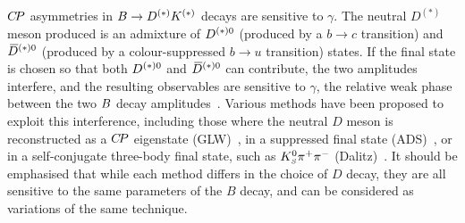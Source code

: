 \label{sec:cp_uta:notations:cus}

$C\!P$ asymmetries in $B \to D^{(*)} K^{(*)}$ decays are sensitive to $\gamma$.
The neutral $D^{(*)}$ meson produced 
is an admixture of $D^{(*)0}$ (produced by a $b \to c$ transition) and 
$\kern 0.2em\overline{\kern -0.2em D}{}^{(*)0}$ (produced by a colour-suppressed $b \to u$ transition) states.
If the final state is chosen so that both $D^{(*)0}$ and $\kern 0.2em\overline{\kern -0.2em D}{}^{(*)0}$ 
can contribute, the two amplitudes interfere,
and the resulting observables are sensitive to $\gamma$, 
the relative weak phase between 
the two $B$ decay amplitudes~\cite{Bigi:1988ym}.
Various methods have been proposed to exploit this interference,
including those where the neutral $D$ meson is reconstructed 
as a $C\!P$ eigenstate (GLW)~\cite{Gronau:1990ra,Gronau:1991dp},
in a suppressed final state (ADS)~\cite{Atwood:1996ci,Atwood:2000ck},
or in a self-conjugate three-body final state, 
such as $K^0_{\scriptscriptstyle S} \pi^+\pi^-$ (Dalitz)~\cite{Giri:2003ty,Poluektov:2004mf}.
It should be emphasised that while each method 
differs in the choice of $D$ decay,
they are all sensitive to the same parameters of the $B$ decay,
and can be considered as variations of the same technique.

